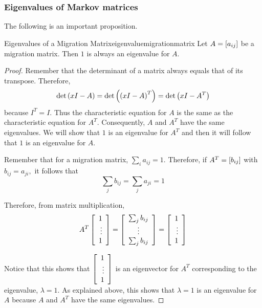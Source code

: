 \subsubsection{Eigenvalues of Markov matrices}

The following is an important proposition.

\begin{proposition}{Eigenvalues of a Migration Matrix}{eigenvaluemigrationmatrix}
Let $A=\left[ a_{ij}\right] $ be a migration matrix. Then $1$ is always an
eigenvalue for $A.$
\end{proposition}

\begin{proof} Remember that the determinant of a matrix always equals that of its transpose. 
Therefore,
\begin{equation*}
\det \left( x I - A\right) =\det \left( \left( x I - A\right)
^{T}\right) =\det \left( x I - A^T\right)
\end{equation*}
because $I^{T}=I.$ Thus the characteristic equation for $A$ is the same as
the characteristic equation for $A^{T}$. Consequently, $A$ and $A^{T}$ have the same
eigenvalues. We will show that $1$ is an eigenvalue for $A^{T}$ and then it
will follow that $1$ is an eigenvalue for $A$.

Remember that for a migration matrix, $\sum_{i}a_{ij}=1.$ Therefore, if 
$A^{T}=\left[ b_{ij}\right] $ with $b_{ij}=a_{ji},$ it follows that
\begin{equation*}
\sum_{j}b_{ij}=\sum_{j}a_{ji}=1
\end{equation*}

Therefore, from matrix multiplication,
\begin{equation*}
A^{T}\left[
\begin{array}{r}
1 \\
\vdots \\
1
\end{array}
\right] =\left[
\begin{array}{c}
\sum_{j}b_{ij} \\
\vdots \\
\sum_{j}b_{ij}
\end{array}
\right] =\left[
\begin{array}{r}
1 \\
\vdots \\
1
\end{array}
\right]
\end{equation*}

Notice that this shows that $\left[
\begin{array}{r}
1 \\
\vdots \\
1
\end{array}
\right] $ is an eigenvector for $A^{T}$ corresponding to the eigenvalue, $\lambda =1.$
 As explained above, this shows that $\lambda =1$ is an
eigenvalue for $A$ because $A$ and $A^{T}$ have the same eigenvalues. 
\end{proof}
